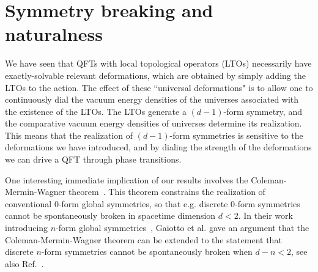 \documentclass[11pt]{article}
\begin{document}
\section{Symmetry breaking and naturalness}
\label{sec:outlook}
We have seen that QFTs with local topological operators (LTOs) necessarily  have exactly-solvable 
relevant deformations, which are obtained by simply adding the LTOs to the action.  
The effect of these ``universal deformations" is to allow one to continuously dial the vacuum energy densities of 
the universes associated with the existence of the LTOs. The LTOs generate a $(d-1)$-form symmetry, and the comparative vacuum energy densities 
of universes determine its realization. This means that the realization of $(d-1)$-form symmetries is sensitive to the deformations we have introduced, and by dialing the strength of the deformations we can drive a QFT through phase transitions.


One interesting immediate implication of our results involves the Coleman-Mermin-Wagner theorem~\cite{Mermin:1966fe,Coleman:1973ci}. 
This theorem constrains the  realization of conventional $0$-form global symmetries, so that e.g. 
discrete $0$-form symmetries cannot be spontaneously broken in spacetime dimension $d < 2$. 
In their work introducing $n$-form global symmetries~\cite{Gaiotto:2014kfa}, Gaiotto et al. 
gave an argument that the Coleman-Mermin-Wagner theorem can be extended to the statement that discrete $n$-form symmetries cannot be spontaneously broken when $d -n  < 2$, see also Ref.~\cite{Lake:2018dqm}.  
\end{document}
